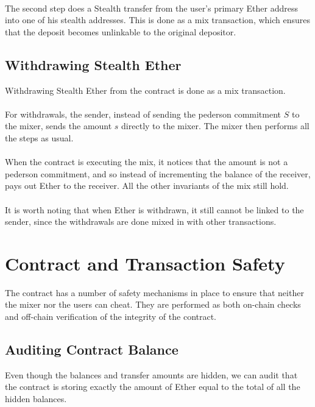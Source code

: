 \documentclass{article}
\begin{document}
\paragraph{}
The second step does a Stealth transfer from the user's primary Ether address into one of his stealth addresses. This is done as a mix transaction, which ensures that the deposit becomes unlinkable to the original depositor. 

\subsection{Withdrawing Stealth Ether}
Withdrawing Stealth Ether from the contract is done as a mix transaction. 
\paragraph{}
For withdrawals, the sender, instead of sending the pederson commitment $S$ to the mixer, sends the amount $s$ directly to the mixer. The mixer then performs all the steps as usual. 
\paragraph{}
When the contract is executing the mix, it notices that the amount is not a pederson commitment, and so instead of incrementing the balance of the receiver, pays out Ether to the receiver. All the other invariants of the mix still hold. 
\paragraph{}
It is worth noting that when Ether is withdrawn, it still cannot be linked to the sender, since the withdrawals are done mixed in with other transactions. 


\section{Contract and Transaction Safety}
The contract has a number of safety mechanisms in place to ensure that neither the mixer nor the users can cheat. They are performed as both on-chain checks and off-chain verification of the integrity of the contract. 

\subsection{Auditing Contract Balance}
Even though the balances and transfer amounts are hidden, we can audit that the contract is storing exactly the amount of Ether equal to the total of all the hidden balances. 
\end{document}

